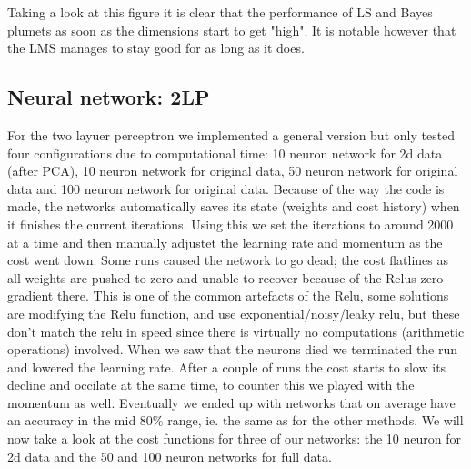 \documentclass[12pt, a4paper]{article}
\begin{document}
Taking a look at this figure it is clear that the performance of LS and Bayes plumets as soon as the dimensions start to get "high". It is notable however that the LMS manages to stay good for as long as it does.



\subsection{Neural network: 2LP}
For the two layuer perceptron we implemented a general version but only tested four configurations due to computational time: 10 neuron network for 2d data (after PCA), 10 neuron network for original data, 50 neuron network for original data and 100 neuron network for original data. Because of the way the code is made, the networks automatically saves its state (weights and cost history) when it finishes the current iterations. Using this we set the iterations to around 2000 at a time and then manually adjustet the learning rate and momentum as the cost went down. Some runs caused the network to go dead; the cost flatlines as all weights are pushed to zero and unable to recover because of the Relus zero gradient there. This is one of the common artefacts of the Relu, some solutions are modifying the Relu function, and use exponential/noisy/leaky relu, but these don't match the relu in speed since there is virtually no computations (arithmetic operations) involved. When we saw that the neurons died we terminated the run and lowered the learning rate. After a couple of runs the cost starts to slow its decline and occilate at the same time, to counter this we played with the momentum as well. Eventually we ended up with networks that on average have an accuracy in the mid 80\% range, ie. the same as for the other methods. We will now take a look at the cost functions for three of our networks: the 10 neuron for 2d data and the 50 and 100 neuron networks for full data.
\end{document}
